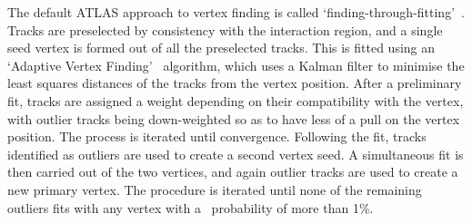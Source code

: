 The default ATLAS approach to vertex finding is called
`finding-through-fitting'~\cite{1742-6596-119-3-032033}. Tracks are preselected
by consistency with the interaction region, and a single seed vertex is formed
out of all the preselected tracks. This is fitted using an `Adaptive Vertex
Finding'~\cite{0954-3899-34-12-N01} algorithm, which uses a Kalman filter to
minimise the least squares distances of the tracks from the vertex position.
After a preliminary fit, tracks are assigned a weight depending on their
compatibility with the vertex, with outlier tracks being down-weighted so as to
have less of a pull on the vertex position. The process is iterated until
convergence.  Following the fit, tracks identified as outliers are used to
create a second vertex seed. A simultaneous fit is then carried out of the two
vertices, and again outlier tracks are used to create a new primary vertex. The
procedure is iterated until none of the remaining outliers fits with any vertex
with a \chisquared\ probability of more than 1\%.

